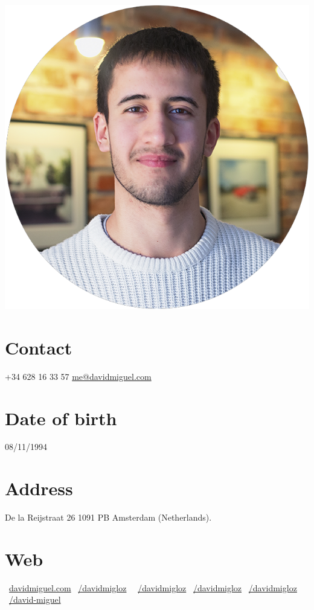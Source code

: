 \documentclass[]{friggeri-cv}
\begin{document}
      

\begin{aside}
  \includegraphics[scale=0.18]{img/profile.png}
  \section{Contact}
    +34 628 16 33 57
    \href{mailto:me@davidmiguel.com}{me@davidmiguel.com}
    ~  
  \section{Date of birth}
    08/11/1994
    ~
  \section{Address}
    De la Reijstraat 26
    1091 PB Amsterdam
    (Netherlands).
    ~    
  \section{Web}
    \faGlobe\ \href{http://davidmiguel.com}{davidmiguel.com}
    \faLinkedin\ \href{https://www.linkedin.com/in/davidmigloz}{/davidmigloz}
    \faFacebook\ \ \href{https://www.facebook.com/DavidMigLoz}{/davidmigloz}
    \faTwitter\ \href{https://twitter.com/DavidMigLoz}{/davidmigloz}
    \faGithub\ \href{https://github.com/davidmigloz/}{/davidmigloz}
    \faStackOverflow\ \href{http://stackoverflow.com/users/6305235/david-miguel}{/david-miguel}
    ~

\end{aside}
\end{document}
